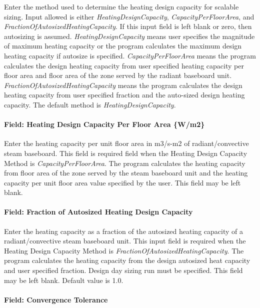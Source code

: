 Enter the method used to determine the heating design capacity for scalable sizing. Input allowed is either \emph{HeatingDesignCapacity}, \emph{CapacityPerFloorArea}, and \emph{FractionOfAutosizedHeatingCapacity}. If this input field is left blank or zero, then autosizing is assumed. \emph{HeatingDesignCapacity} means user specifies the magnitude of maximum heating capacity or the program calculates the maximum design heating capacity if autosize is specified. \emph{CapacityPerFloorArea} means the program calculates the design heating capacity from user specified heating capacity per floor area and floor area of the zone served by the radiant baseboard unit. \emph{FractionOfAutosizedHeatingCapacity} means the program calculates the design heating capacity from user specified fraction and the auto-sized design heating capacity. The default method is \emph{HeatingDesignCapacity}.

\paragraph{Field: Heating Design Capacity Per Floor Area \{W/m2\}}\label{field-heating-design-capacity-per-floor-area-wm2-1-000}

Enter the heating capacity per unit floor area in m3/s-m2 of radiant/convective steam baseboard. This field is required field when the Heating Design Capacity Method is \emph{CapacityPerFloorArea}. The program calculates the heating capacity from floor area of the zone served by the steam baseboard unit and the heating capacity per unit floor area value specified by the user. This field may be left blank.

\paragraph{Field: Fraction of Autosized Heating Design Capacity}\label{field-fraction-of-autosized-heating-design-capacity-1-000}

Enter the heating capacity as a fraction of the autosized heating capacity of a radiant/convective steam baseboard unit. This input field is required when the Heating Design Capacity Method is \emph{FractionOfAutosizedHeatingCapacity}. The program calculates the heating capacity from the design autosized heat capacity and user specified fraction. Design day sizing run must be specified. This field may be left blank. Default value is 1.0.

\paragraph{Field: Convergence Tolerance}\label{field-convergence-tolerance-1-000}

